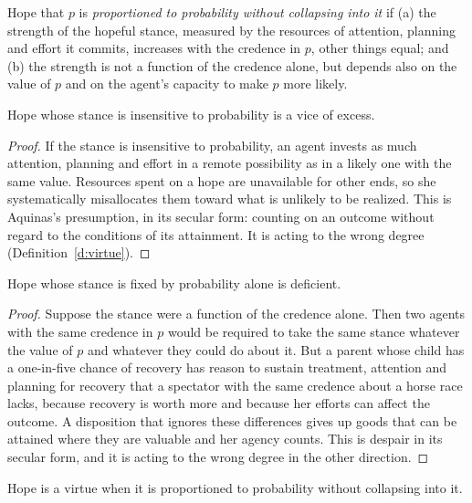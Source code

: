 \documentclass{situationist-preprint}
\begin{document}
\begin{definition}\label{d:prop}
Hope that $p$ is \emph{proportioned to probability without collapsing into it} if (a) the strength of the hopeful stance, measured by the resources of attention, planning and effort it commits, increases with the credence in $p$, other things equal; and (b) the strength is not a function of the credence alone, but depends also on the value of $p$ and on the agent's capacity to make $p$ more likely.
\end{definition}

\begin{lemma}\label{l:sensitive}
Hope whose stance is insensitive to probability is a vice of excess.
\end{lemma}

\begin{proof}
If the stance is insensitive to probability, an agent invests as much attention, planning and effort in a remote possibility as in a likely one with the same value. Resources spent on a hope are unavailable for other ends, so she systematically misallocates them toward what is unlikely to be realized. This is Aquinas's presumption, in its secular form: counting on an outcome without regard to the conditions of its attainment. It is acting to the wrong degree (Definition~\ref{d:virtue}).
\end{proof}

\begin{lemma}\label{l:collapse}
Hope whose stance is fixed by probability alone is deficient.
\end{lemma}

\begin{proof}
Suppose the stance were a function of the credence alone. Then two agents with the same credence in $p$ would be required to take the same stance whatever the value of $p$ and whatever they could do about it. But a parent whose child has a one-in-five chance of recovery has reason to sustain treatment, attention and planning for recovery that a spectator with the same credence about a horse race lacks, because recovery is worth more and because her efforts can affect the outcome. A disposition that ignores these differences gives up goods that can be attained where they are valuable and her agency counts. This is despair in its secular form, and it is acting to the wrong degree in the other direction.
\end{proof}

\begin{theorem}\label{t:main}
Hope is a virtue when it is proportioned to probability without collapsing into it.
\end{theorem}
\end{document}

